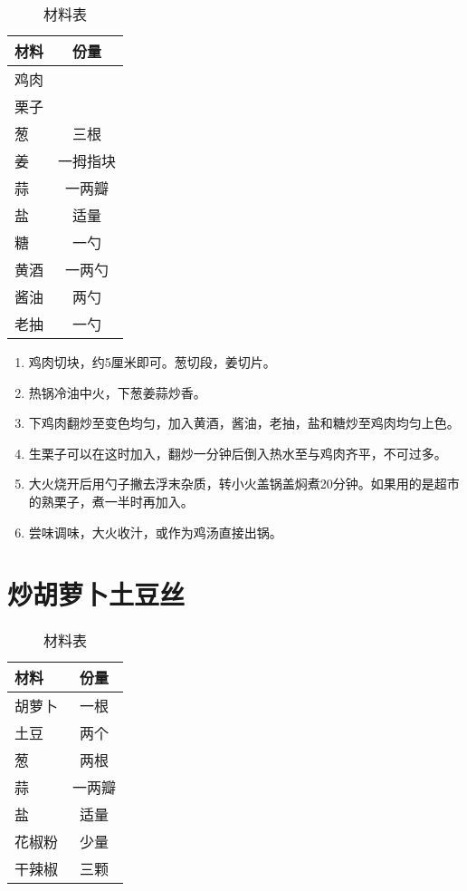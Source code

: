 \begin{table}[h]
    \centering
    \begin{tabular}{|l||c|}\hline
     \textbf{材料}    &  \textbf{份量}\\ \hline\hline
    鸡肉    &   \\ \hline
    栗子     &  \\ \hline
    葱     &  三根 \\ \hline
    姜     & 一拇指块  \\ \hline
    蒜     & 一两瓣  \\ \hline
    盐     & 适量  \\ \hline
    糖     & 一勺  \\ \hline
    黄酒     & 一两勺  \\ \hline
    酱油     & 两勺  \\ \hline
    老抽     & 一勺  \\ \hline
    \end{tabular}
    \caption{材料表}
\end{table}

\begin{enumerate}
    \item 鸡肉切块，约5厘米即可。葱切段，姜切片。
 
    \item 热锅冷油中火，下葱姜蒜炒香。
  
    \item 下鸡肉翻炒至变色均匀，加入黄酒，酱油，老抽，盐和糖炒至鸡肉均匀上色。

    \item 生栗子可以在这时加入，翻炒一分钟后倒入热水至与鸡肉齐平，不可过多。
    
    \item 大火烧开后用勺子撇去浮末杂质，转小火盖锅盖焖煮20分钟。如果用的是超市的熟栗子，煮一半时再加入。
    
    \item 尝味调味，大火收汁，或作为鸡汤直接出锅。
\end{enumerate}

\section{炒胡萝卜土豆丝}

\begin{table}[h]
    \centering
    \begin{tabular}{|l||c|}\hline
     \textbf{材料}    &  \textbf{份量}\\ \hline\hline
    胡萝卜    &  一根 \\ \hline
    土豆     &  两个 \\ \hline
    葱     &  两根 \\ \hline
    蒜     & 一两瓣  \\ \hline
    盐     & 适量  \\ \hline
    花椒粉     & 少量  \\ \hline
    干辣椒     & 三颗  \\ \hline
    \end{tabular}
    \caption{材料表}
\end{table}

